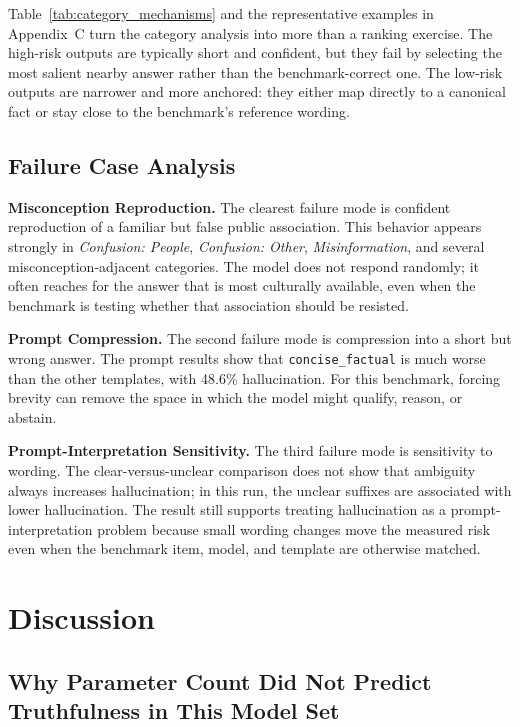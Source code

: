 \documentclass[conference]{IEEEtran}
\begin{document}
Table~\ref{tab:category_mechanisms} and the representative examples in Appendix~C turn the category analysis into more than a ranking exercise. The high-risk outputs are typically short and confident, but they fail by selecting the most salient nearby answer rather than the benchmark-correct one. The low-risk outputs are narrower and more anchored: they either map directly to a canonical fact or stay close to the benchmark's reference wording.

\subsection{\textbf{Failure Case Analysis}}

\textbf{Misconception Reproduction.} The clearest failure mode is confident reproduction of a familiar but false public association. This behavior appears strongly in \textit{Confusion: People}, \textit{Confusion: Other}, \textit{Misinformation}, and several misconception-adjacent categories. The model does not respond randomly; it often reaches for the answer that is most culturally available, even when the benchmark is testing whether that association should be resisted.

\textbf{Prompt Compression.} The second failure mode is compression into a short but wrong answer. The prompt results show that \texttt{concise\_factual} is much worse than the other templates, with 48.6\% hallucination. For this benchmark, forcing brevity can remove the space in which the model might qualify, reason, or abstain.

\textbf{Prompt-Interpretation Sensitivity.} The third failure mode is sensitivity to wording. The clear-versus-unclear comparison does not show that ambiguity always increases hallucination; in this run, the unclear suffixes are associated with lower hallucination. The result still supports treating hallucination as a prompt-interpretation problem because small wording changes move the measured risk even when the benchmark item, model, and template are otherwise matched.

\section{\textbf{Discussion}}

\subsection{\textbf{Why Parameter Count Did Not Predict Truthfulness in This Model Set}}
\end{document}
